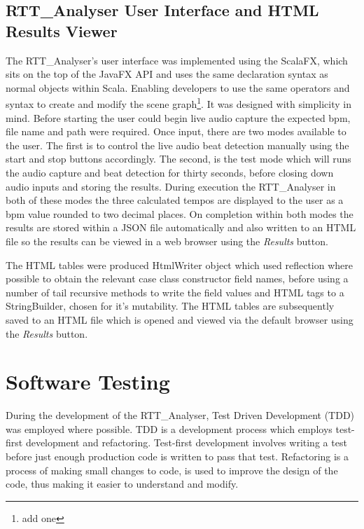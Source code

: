 \documentclass[a4paper, 11pt]{article}
\begin{document}
\subsection{RTT\_Analyser User Interface and HTML Results Viewer}
The RTT\_Analyser's user interface was implemented using the ScalaFX, which sits on the top of the JavaFX API and uses the same declaration syntax as normal objects within Scala. Enabling developers to use the same operators and syntax to create and modify the scene graph\footnote{add one}\cite{scalafx}. It was designed with simplicity in mind. Before starting the user could begin live audio capture the expected bpm, file name and path were required. Once input, there are two modes available to the user. The first is to control the live audio beat detection manually using the start and stop buttons accordingly. The second, is the test mode which will runs the audio capture and beat detection for thirty seconds, before closing down audio inputs and storing the results. During execution the RTT\_Analyser in both of these modes the three calculated tempos are displayed to the user as a bpm value rounded to two decimal places. On completion within both modes the results are stored within a JSON file automatically and also written to an HTML file so the results can be viewed in a web browser using the \textit{Results} button.\par

The HTML tables were produced HtmlWriter object which used reflection where possible to obtain the relevant case class constructor field names, before using a number of tail recursive methods to write the field values and HTML tags to a StringBuilder, chosen for it's mutability. The HTML tables are subsequently saved to an HTML file which is opened and viewed via the default browser using the \textit{Results} button.

\maketitle{}\section{Software Testing}
During the development of the RTT\_Analyser, Test Driven Development (TDD) was employed where possible. TDD is a development process which employs test-first development and refactoring. Test-first development involves writing a test before just enough production code is written to pass that test\cite{tdd1}. Refactoring is a process of making small changes to code, is used to improve the design of the code, thus making it easier to understand and modify\cite{tdd2}. \par
\end{document}
